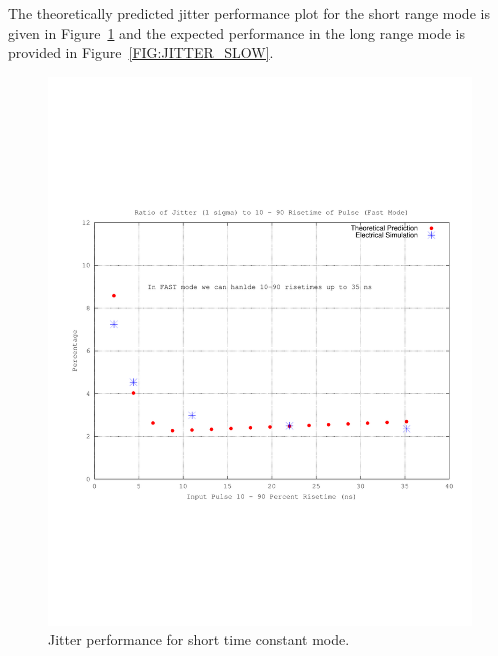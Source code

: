 \documentclass[12pt,oneside,final]{siuethesis}
\theoremstyle{definition}
\begin{document}
The theoretically predicted jitter performance plot for the short range mode is given in Figure~\ref{FIG:JITTER_FAST} and the expected performance in the long range mode is provided in Figure~\ref{FIG:JITTER_SLOW}.

\begin{figure}[htbp!]
	\centering
 	\includegraphics[scale=0.7,keepaspectratio=true]{../Design_Reports/CFD_circuit_report/images/jitter_fast_mode.pdf} 	
 	\caption{Jitter performance for short time constant mode.}
 	\label{FIG:JITTER_FAST}
 	
\end{figure}
\end{document}

